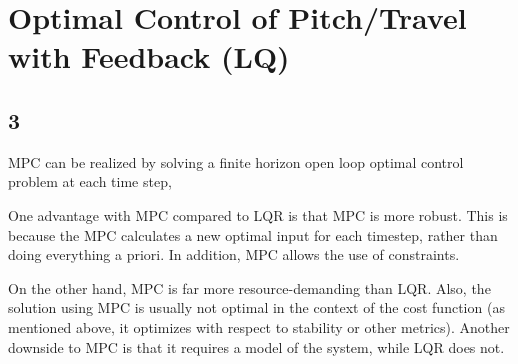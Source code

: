
\section{Optimal Control of Pitch/Travel with Feedback (LQ)}
\subsection{3}
MPC can be realized by solving a finite horizon open loop optimal control problem at each time step, 

One advantage with MPC compared to LQR is that MPC is more robust. This is because the MPC calculates a new optimal input for each timestep, rather than doing everything a priori. In addition, MPC allows the use of constraints.

\missingfigure{\label{fig:prob3_lambda}}

On the other hand, MPC is far more resource-demanding than LQR. Also, the solution using MPC is usually not optimal in the context of the cost function (as mentioned above, it optimizes with respect to stability or other metrics). Another downside to MPC is that it requires a model of the system, while LQR does not.
